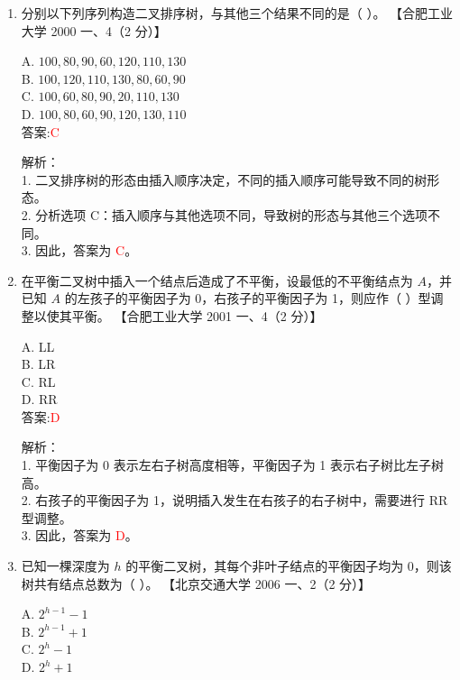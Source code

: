\documentclass[lang=cn,newtx,10pt,scheme=chinese]{../../../elegantbook}
\begin{document}
\begin{enumerate}
\item 分别以下列序列构造二叉排序树，与其他三个结果不同的是（ ）。  
    【合肥工业大学 2000 一、4（2 分）】  

    A. $100, 80, 90, 60, 120, 110, 130$ \\  
    B. $100, 120, 110, 130, 80, 60, 90$ \\  
    C. $100, 60, 80, 90, 20, 110, 130$ \\  
    D. $100, 80, 60, 90, 120, 130, 110$ \\  

    答案:\textcolor{red}{C}

    解析：\\
    1. 二叉排序树的形态由插入顺序决定，不同的插入顺序可能导致不同的树形态。\\
    2. 分析选项 C：插入顺序与其他选项不同，导致树的形态与其他三个选项不同。\\
    3. 因此，答案为 \textcolor{red}{C}。\\

\item 在平衡二叉树中插入一个结点后造成了不平衡，设最低的不平衡结点为 $A$，并已知 $A$ 的左孩子的平衡因子为 0，右孩子的平衡因子为 1，则应作（ ）型调整以使其平衡。  
    【合肥工业大学 2001 一、4（2 分）】  

    A. LL \\  
    B. LR \\  
    C. RL \\  
    D. RR \\  

    答案:\textcolor{red}{D}

    解析：\\
    1. 平衡因子为 0 表示左右子树高度相等，平衡因子为 1 表示右子树比左子树高。\\
    2. 右孩子的平衡因子为 1，说明插入发生在右孩子的右子树中，需要进行 RR 型调整。\\
    3. 因此，答案为 \textcolor{red}{D}。\\

\item 已知一棵深度为 $h$ 的平衡二叉树，其每个非叶子结点的平衡因子均为 0，则该树共有结点总数为（ ）。  
    【北京交通大学 2006 一、2（2 分）】  

    A. $2^{h-1} - 1$ \\  
    B. $2^{h-1} + 1$ \\  
    C. $2^{h} - 1$ \\  
    D. $2^{h} + 1$ \\  


\end{enumerate}
\end{document}
